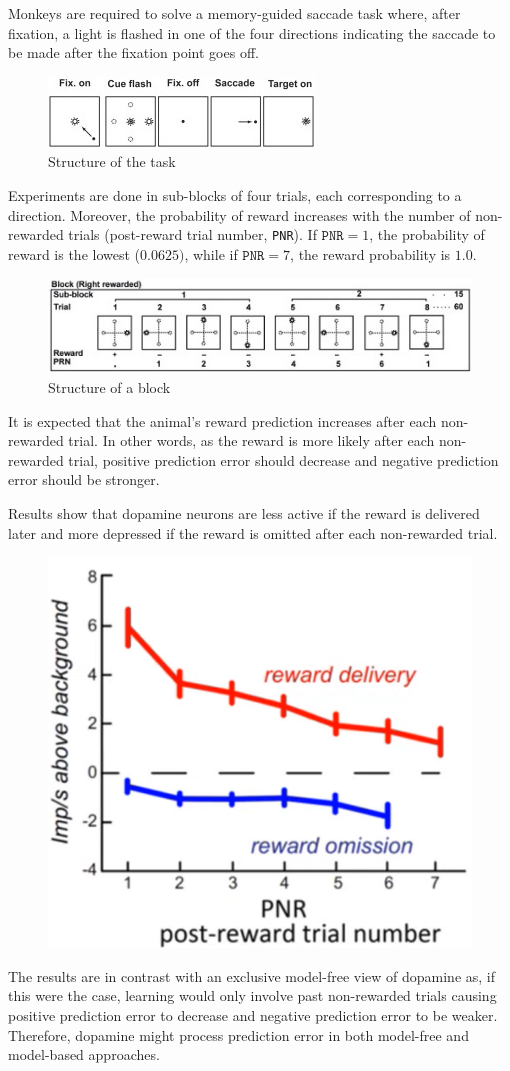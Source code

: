 \begin{casestudy}
    Monkeys are required to solve a memory-guided saccade task where, after fixation, 
    a light is flashed in one of the four directions indicating the saccade to be made after the fixation point goes off.
    \begin{figure}[H]
        \centering
        \includegraphics[width=0.4\linewidth]{./img/saccade1.png}
        \caption{Structure of the task}
    \end{figure}

    Experiments are done in sub-blocks of four trials, each corresponding to a direction.
    Moreover, the probability of reward increases with the number of non-rewarded trials (post-reward trial number, \texttt{PNR}).
    If $\texttt{PNR} = 1$, the probability of reward is the lowest ($0.0625)$, while if $\texttt{PNR} = 7$, the reward probability is $1.0$.
    \begin{figure}[H]
        \centering
        \includegraphics[width=0.6\linewidth]{./img/saccade2.png}
        \caption{Structure of a block}
    \end{figure}


    It is expected that the animal's reward prediction increases after each non-rewarded trial.
    In other words, as the reward is more likely after each non-rewarded trial, positive prediction error should decrease and 
    negative prediction error should be stronger.

    Results show that dopamine neurons are less active if the reward is delivered later
    and more depressed if the reward is omitted after each non-rewarded trial.
    \begin{figure}[H]
        \centering
        \includegraphics[width=0.25\linewidth]{./img/saccade3.png}
    \end{figure}

    The results are in contrast with an exclusive model-free view of dopamine as, if this were the case, 
    learning would only involve past non-rewarded trials causing positive prediction error to decrease and negative prediction error to be weaker.
    Therefore, dopamine might process prediction error in both model-free and model-based approaches.
\end{casestudy}

